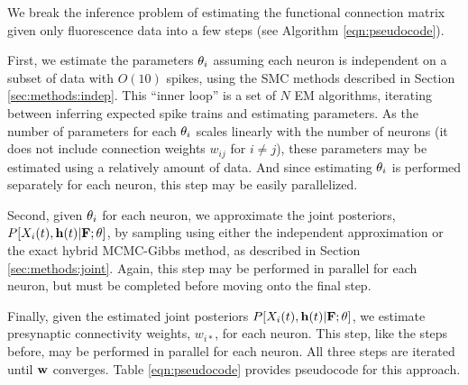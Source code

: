 We break the inference problem of estimating the functional connection matrix given only fluorescence data into a few  steps (see Algorithm \ref{eqn:pseudocode}).  

First, we estimate the parameters $\mathbf{\theta}_i$ assuming each neuron is independent on a subset of data with $O(10)$ spikes, using the SMC methods described in Section \ref{sec:methods:indep}.  This ``inner loop'' is a set of $N$ EM algorithms, iterating between inferring expected spike trains and estimating parameters. As the number of parameters for each $\mathbf{\theta}_i$ scales linearly with the number of neurons (it does not include connection weights $w_{ij}$ for $i\neq j$), these parameters may be estimated using a relatively amount of data. And since estimating $\mathbf{\theta}_i$  is performed separately for each neuron, this step may be easily parallelized.




Second, given $\mathbf{\theta}_i$ for each neuron, we approximate the joint posteriors, $P[X_i(t), \mathbf{h}(t) | {\bf F}; \mathbf{\theta}]$, by sampling using either the independent approximation or the exact hybrid MCMC-Gibbs method, as described in Section \ref{sec:methods:joint}.  Again, this step may be performed in parallel for each neuron, but must be completed before moving onto the final step.

  
Finally, given the estimated joint posteriors $P[X_i(t), \mathbf{h}(t) | {\bf F}; \mathbf{\theta}]$, we estimate presynaptic connectivity weights, $w_{i \ast}$, for each neuron.  This step, like the steps before, may be performed in parallel for each neuron.  All three steps are iterated until $\mathbf{w}$ converges. Table \ref{eqn:pseudocode} provides pseudocode for this approach.  

